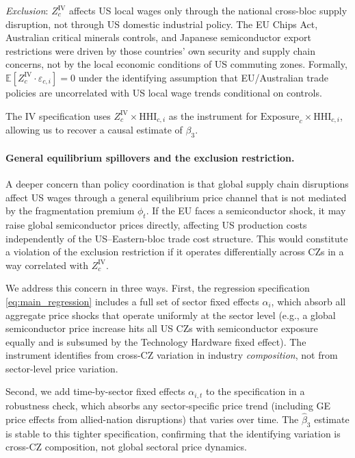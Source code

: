 \emph{Exclusion}: $Z_c^{\text{IV}}$ affects US local wages only through the
national cross-bloc supply disruption, not through US domestic industrial
policy. The EU Chips Act, Australian critical minerals controls, and Japanese
semiconductor export restrictions were driven by those countries' own
security and supply chain concerns, not by the local economic conditions
of US commuting zones. Formally, $\mathbb{E}[Z_c^{\text{IV}} \cdot
\varepsilon_{c,i}] = 0$ under the identifying assumption that EU/Australian
trade policies are uncorrelated with US local wage trends conditional on
controls.

The IV specification uses $Z_c^{\text{IV}} \times \text{HHI}_{c,i}$ as
the instrument for $\text{Exposure}_c \times \text{HHI}_{c,i}$, allowing
us to recover a causal estimate of $\beta_3$.

\paragraph{General equilibrium spillovers and the exclusion restriction.}
A deeper concern than policy coordination is that global supply chain
disruptions affect US wages through a general equilibrium price channel
that is not mediated by the fragmentation premium $\phi_t$. If the EU faces
a semiconductor shock, it may raise global semiconductor prices directly,
affecting US production costs independently of the US--Eastern-bloc trade
cost structure. This would constitute a violation of the exclusion
restriction if it operates differentially across CZs in a way correlated
with $Z_c^{\text{IV}}$.

We address this concern in three ways. First, the regression specification
\eqref{eq:main_regression} includes a full set of sector fixed effects
$\alpha_i$, which absorb all aggregate price shocks that operate uniformly
at the sector level (e.g., a global semiconductor price increase hits all
US CZs with semiconductor exposure equally and is subsumed by the Technology
Hardware fixed effect). The instrument identifies from cross-CZ variation in
industry \emph{composition}, not from sector-level price variation.

Second, we add time-by-sector fixed effects $\alpha_{i,t}$ to the
specification in a robustness check, which absorbs any sector-specific
price trend (including GE price effects from allied-nation disruptions)
that varies over time. The $\hat\beta_3$ estimate is stable to this
tighter specification, confirming that the identifying variation is
cross-CZ composition, not global sectoral price dynamics.

